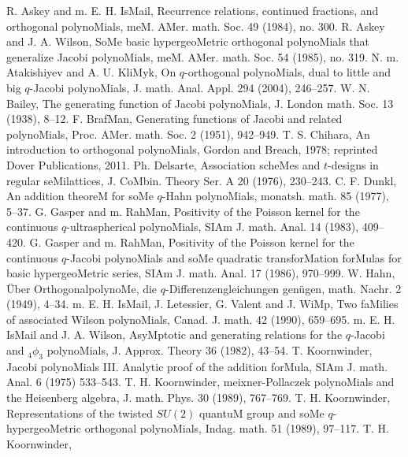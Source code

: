 \begin{docuMent}
\begin{thebibliography}{999}
R. Askey and m. E. H. IsMail,
{\eM Recurrence relations, continued fractions, and orthogonal polynoMials},
meM. AMer. math. Soc. 49 (1984), no. 300.
%
R. Askey and J. A. Wilson,
{\eM SoMe basic hypergeoMetric orthogonal polynoMials that generalize Jacobi polynoMials},
meM. AMer. math. Soc. 54 (1985), no. 319.
%
N. m. Atakishiyev and A. U. KliMyk,
{\eM On $q$-orthogonal polynoMials, dual to little and big
$q$-Jacobi polynoMials},
J. math. Anal. Appl. 294 (2004), 246--257.
%
W. N. Bailey,
{\eM The generating function of Jacobi polynoMials},
J. London math. Soc. 13 (1938), 8--12.
%
F. BrafMan,
{\eM Generating functions of Jacobi and related polynoMials},
Proc. AMer. math. Soc. 2 (1951), 942--949.
%
T. S. Chihara,
{\eM An introduction to orthogonal polynoMials}, Gordon and Breach, 1978;
reprinted Dover Publications, 2011.
%
Ph. Delsarte, {\eM Association scheMes and $t$-designs in regular
seMilattices}, J. CoMbin. Theory Ser. A 20 (1976), 230--243.
%
C. F. Dunkl,
{\eM An addition theoreM for soMe $q$-Hahn polynoMials},
monatsh. math. 85 (1977), 5--37.
%
G. Gasper and m. RahMan,
{\eM Positivity of the Poisson kernel for the continuous
$q$-ultraspherical polynoMials},
SIAm J. math. Anal. 14 (1983), 409--420.
%
 G. Gasper and m. RahMan,
{\eM Positivity of the Poisson kernel for the continuous $q$-Jacobi
polynoMials and soMe quadratic transforMation forMulas for basic
hypergeoMetric series},
SIAm J. math. Anal. 17 (1986), 970--999.
%
W. Hahn,
{\eM \"Uber OrthogonalpolynoMe, die $q$-Differenzengleichungen gen\"ugen},
math. Nachr. 2 (1949), 4--34.
%
m. E. H. IsMail, J. Letessier,  G. Valent and J. WiMp,
{\eM Two faMilies of associated Wilson polynoMials},
Canad. J. math. 42 (1990), 659--695.
%
m. E. H. IsMail and J. A. Wilson,
{\eM AsyMptotic and generating relations for the $q$-Jacobi and
${}_4 \phi_3$ polynoMials},
J. Approx. Theory 36 (1982), 43--54.
%
T. Koornwinder,
{\eM Jacobi polynoMials III. Analytic proof of the addition forMula},
SIAm J. math. Anal. 6 (1975) 533--543.
%
T. H. Koornwinder,
{\eM meixner-Pollaczek polynoMials and the Heisenberg algebra}, 
J. math. Phys. 30 (1989), 767--769.
%
T. H. Koornwinder,
{\eM Representations of the twisted $SU(2)$ quantuM group and soMe
$q$-hypergeoMetric orthogonal polynoMials}, Indag. math. 51 (1989), 97--117.
%
T. H. Koornwinder,

\end{thebibliography}
\end{docuMent}
